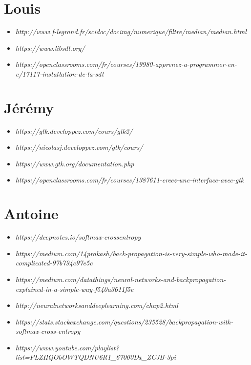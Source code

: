 \documentclass[12pt]{report}
\begin{document}
\section*{Louis}

\begin{itemize}
	\item \textit{http://www.f-legrand.fr/scidoc/docimg/numerique/filtre/median/median.html}
	\item \textit{https://www.libsdl.org/}
	\item \textit{https://openclassrooms.com/fr/courses/19980-apprenez-a-programmer-en-c/17117-installation-de-la-sdl}
\end{itemize}

\section*{Jérémy}

\begin{itemize}
	\item \textit{https://gtk.developpez.com/cours/gtk2/}
	\item \textit{https://nicolasj.developpez.com/gtk/cours/}
	\item \textit{https://www.gtk.org/documentation.php}
	\item \textit{https://openclassrooms.com/fr/courses/1387611-creez-une-interface-avec-gtk}
\end{itemize}

\section*{Antoine}

\begin{itemize}
	\item \textit{https://deepnotes.io/softmax-crossentropy}
	\item \textit{https://medium.com/\@14prakash/back-propagation-is-very-simple-who-made-it-complicated-97b794c97e5c}
	\item \textit{https://medium.com/datathings/neural-networks-and-backpropagation-explained-in-a-simple-way-f540a3611f5e}
	\item \textit{http://neuralnetworksanddeeplearning.com/chap2.html}
	\item \textit{https://stats.stackexchange.com/questions/235528/backpropagation-with-softmax-cross-entropy}
	\item \textit{https://www.youtube.com/playlist?list=PLZHQObOWTQDNU6R1\_67000Dx\_ZCJB-3pi}
\end{itemize}
\end{document}

